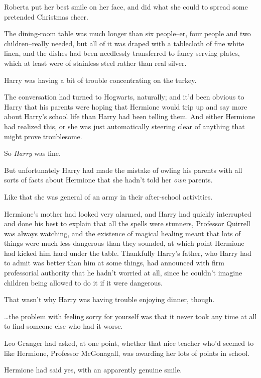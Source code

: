 Roberta put her best smile on her face, and did what she could to spread some pretended Christmas cheer.

\later

The dining-room table was much longer than six people\---er, four people and two children\---really needed, but all of it was draped with a tablecloth of fine white linen, and the dishes had been needlessly transferred to fancy serving plates, which at least were of stainless steel rather than real silver.

Harry was having a bit of trouble concentrating on the turkey.

The conversation had turned to Hogwarts, naturally; and it'd been obvious to Harry that his parents were hoping that Hermione would trip up and say more about Harry's school life than Harry had been telling them. And either Hermione had realized this, or she was just automatically steering clear of anything that might prove troublesome.

So \emph{Harry} was fine.

But unfortunately Harry had made the mistake of owling his parents with all sorts of facts about Hermione that she hadn't told her \emph{own} parents.

Like that she was general of an army in their after-school activities.

Hermione's mother had looked very alarmed, and Harry had quickly interrupted and done his best to explain that all the spells were stunners, Professor Quirrell was always watching, and the existence of magical healing meant that lots of things were much less dangerous than they sounded, at which point Hermione had kicked him hard under the table. Thankfully Harry's father, who Harry had to admit was better than him at some things, had announced with firm professorial authority that he hadn't worried at all, since he couldn't imagine children being allowed to do it if it were dangerous.

That wasn't why Harry was having trouble enjoying dinner, though.

{\ldots}the problem with feeling sorry for yourself was that it never took any time at all to find someone else who had it worse.

Leo Granger had asked, at one point, whether that nice teacher who'd seemed to like Hermione, Professor McGonagall, was awarding her lots of points in school.

Hermione had said yes, with an apparently genuine smile.


